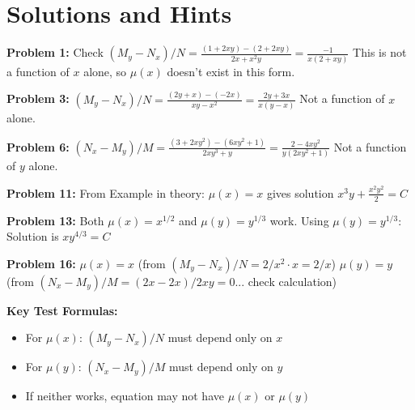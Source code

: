 \documentclass[12pt]{article}
\begin{document}
\section*{Solutions and Hints}

\textbf{Problem 1:} Check $(M_y - N_x)/N = \frac{(1 + 2xy) - (2 + 2xy)}{2x + x^2y} = \frac{-1}{x(2 + xy)}$
This is not a function of $x$ alone, so $\mu(x)$ doesn't exist in this form.

\textbf{Problem 3:} $(M_y - N_x)/N = \frac{(2y + x) - (-2x)}{xy - x^2} = \frac{2y + 3x}{x(y - x)}$
Not a function of $x$ alone.

\textbf{Problem 6:} $(N_x - M_y)/M = \frac{(3 + 2xy^2) - (6xy^2 + 1)}{2xy^3 + y} = \frac{2 - 4xy^2}{y(2xy^2 + 1)}$
Not a function of $y$ alone.

\textbf{Problem 11:} From Example in theory: $\mu(x) = x$ gives solution $x^3y + \frac{x^2y^2}{2} = C$

\textbf{Problem 13:} Both $\mu(x) = x^{1/2}$ and $\mu(y) = y^{1/3}$ work.
Using $\mu(y) = y^{1/3}$: Solution is $xy^{4/3} = C$

\textbf{Problem 16:} 
$\mu(x) = x$ (from $(M_y - N_x)/N = 2/x^2 \cdot x = 2/x$)
$\mu(y) = y$ (from $(N_x - M_y)/M = (2x - 2x)/2xy = 0$... check calculation)

\textbf{Key Test Formulas:}
\begin{itemize}
    \item For $\mu(x)$: $(M_y - N_x)/N$ must depend only on $x$
    \item For $\mu(y)$: $(N_x - M_y)/M$ must depend only on $y$
    \item If neither works, equation may not have $\mu(x)$ or $\mu(y)$
\end{itemize}
\end{document}
